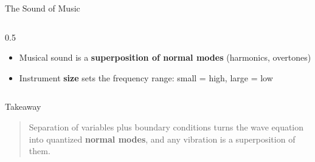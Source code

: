 \documentclass[
  ignorenonframetext,
  aspectratio=169,
  handout]{beamer}
\providecommand{\tightlist}{%
  \setlength{\itemsep}{0pt}\setlength{\parskip}{0pt}}
\begin{document}
\begin{frame}
\begin{block}{The Sound of Music}
\begin{columns}[T]
\begin{column}{0.5\linewidth}
\begin{itemize}
\tightlist
\item
  Musical sound is a \textbf{superposition of normal modes} (harmonics,
  overtones)
\item
  Instrument \textbf{size} sets the frequency range: small = high, large
  = low
\end{itemize}
\end{column}
\end{columns}
\end{block}
\end{frame}

\begin{frame}{Takeaway}
\protect{}\label{takeaway}
\begin{quote}
Separation of variables plus boundary conditions turns the wave equation
into quantized \textbf{normal modes}, and any vibration is a
superposition of them.
\end{quote}
\end{frame}
\end{document}
